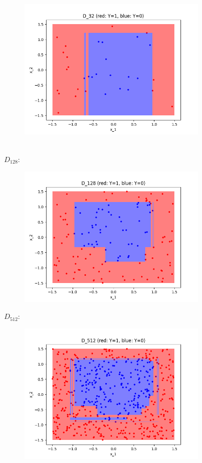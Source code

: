 \documentclass[a4paper]{article}
\theoremstyle{definition}
\newenvironment{soln}{
    \leavevmode\color{blue}\ignorespaces
}{}
\begin{document}
\begin{enumerate}
\begin{soln}
\begin{figure}[h!]
        \includegraphics[width=0.8\textwidth]{images/D_32ScatterDecisionBoundary.png}  
        \captionsetup{labelformat=empty}
        \caption{}
        \label{fig:mixed}
    \end{figure}
    \\ $D_{128}$:
    \begin{figure}[h!]
        \centering
        \includegraphics[width=0.8\textwidth]{images/D_128ScatterDecisionBoundary.png}  
        \captionsetup{labelformat=empty}
        \caption{}
        \label{fig:mixed}
    \end{figure}
    \newpage
    $D_{512}$:
    \begin{figure}[h!]
        \centering
        \includegraphics[width=0.8\textwidth]{images/D_512ScatterDecisionBoundary.png}  

\end{figure}
\end{soln}
\end{enumerate}
\end{document}
